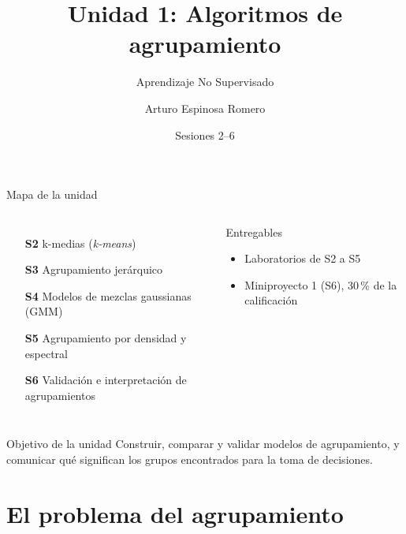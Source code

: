\documentclass[aspectratio=169,11pt]{beamer}
\title[Unidad 1: Algoritmos de agrupamiento]{Unidad 1: Algoritmos de agrupamiento}
\subtitle{Aprendizaje No Supervisado}
\author[A. Espinosa Romero]{Arturo Espinosa Romero}
\institute[FMAT]{Maestría en Inteligencia Artificial \\ Facultad de Matemáticas}
\date{Sesiones 2--6}
\begin{document}
\begin{frame}
  \titlepage
\end{frame}

\begin{frame}{Mapa de la unidad}
  \begin{columns}[T]
    \begin{enumerate}
      \item[\textbf{S2}] k-medias (\emph{k-means})
      \item[\textbf{S3}] Agrupamiento jerárquico
      \item[\textbf{S4}] Modelos de mezclas gaussianas (GMM)
      \item[\textbf{S5}] Agrupamiento por densidad y espectral
      \item[\textbf{S6}] Validación e interpretación de agrupamientos
    \end{enumerate}
    \begin{block}{Entregables}
      \begin{itemize}
        \item Laboratorios de S2 a S5
        \item Miniproyecto 1 (S6), 30\,\% de la calificación
      \end{itemize}
    \end{block}
  \end{columns}
  \vspace{6pt}
  \begin{alertblock}{Objetivo de la unidad}
    Construir, comparar y validar modelos de agrupamiento, y comunicar qué
    significan los grupos encontrados para la toma de decisiones.
  \end{alertblock}
\end{frame}

\section{El problema del agrupamiento}
\end{document}
